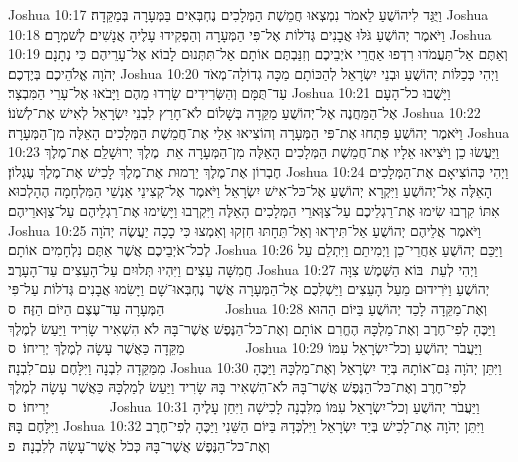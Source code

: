 Joshua 10:17	וַיֻּגַּד לִיהוֹשֻׁעַ לֵאמֹר נִמְצְאוּ חֲמֵשֶׁת הַמְּלָכִים נֶחְבְּאִים בַּמְּעָרָה בְּמַקֵּדָה׃
Joshua 10:18	וַיֹּאמֶר יְהוֹשֻׁעַ גֹּלּוּ אֲבָנִים גְּדֹלוֹת אֶל־פִּי הַמְּעָרָה וְהַפְקִידוּ עָלֶיהָ אֲנָשִׁים לְשׁמְרָם׃
Joshua 10:19	וְאַתֶּם אַל־תַּעֲמֹדוּ רִדְפוּ אַחֲרֵי אֹיְבֵיכֶם וְזִנַּבְתֶּם אוֹתָם אַל־תִּתְּנוּם לָבוֹא אֶל־עָרֵיהֶם כִּי נְתָנָם יְהֹוָה אֱלֹהֵיכֶם בְּיֶדְכֶם׃
Joshua 10:20	וַיְהִי כְּכַלּוֹת יְהוֹשֻׁעַ וּבְנֵי יִשְׂרָאֵל לְהַכּוֹתָם מַכָּה גְדוֹלָה־מְאֹד עַד־תֻּמָּם וְהַשְּׂרִידִים שָׂרְדוּ מֵהֶם וַיָּבֹאוּ אֶל־עָרֵי הַמִּבְצָר׃
Joshua 10:21	וַיָּשֻׁבוּ כל־הָעָם אֶל־הַמַּחֲנֶה אֶל־יְהוֹשֻׁעַ מַקֵּדָה בְּשָׁלוֹם לֹא־חָרַץ לִבְנֵי יִשְׂרָאֵל לְאִישׁ אֶת־לְשֹׁנוֹ׃
Joshua 10:22	וַיֹּאמֶר יְהוֹשֻׁעַ פִּתְחוּ אֶת־פִּי הַמְּעָרָה וְהוֹצִיאוּ אֵלַי אֶת־חֲמֵשֶׁת הַמְּלָכִים הָאֵלֶּה מִן־הַמְּעָרָה׃
Joshua 10:23	וַיַּעֲשׂוּ כֵן וַיֹּצִיאוּ אֵלָיו אֶת־חֲמֵשֶׁת הַמְּלָכִים הָאֵלֶּה מִן־הַמְּעָרָה אֵת  מֶלֶךְ יְרוּשָׁלַ͏ִם אֶת־מֶלֶךְ חֶבְרוֹן אֶת־מֶלֶךְ יַרְמוּת אֶת־מֶלֶךְ לָכִישׁ אֶת־מֶלֶךְ עֶגְלוֹן׃
Joshua 10:24	וַיְהִי כְּהוֹצִיאָם אֶת־הַמְּלָכִים הָאֵלֶּה אֶל־יְהוֹשֻׁעַ וַיִּקְרָא יְהוֹשֻׁעַ אֶל־כּל־אִישׁ יִשְׂרָאֵל וַיֹּאמֶר אֶל־קְצִינֵי אַנְשֵׁי הַמִּלְחָמָה הֶהָלְכוּא אִתּוֹ קִרְבוּ שִׂימוּ אֶת־רַגְלֵיכֶם עַל־צַוְּארֵי הַמְּלָכִים הָאֵלֶּה וַיִּקְרְבוּ וַיָּשִׂימוּ אֶת־רַגְלֵיהֶם עַל־צַוְּארֵיהֶם׃
Joshua 10:25	וַיֹּאמֶר אֲלֵיהֶם יְהוֹשֻׁעַ אַל־תִּירְאוּ וְאַל־תֵּחָתּוּ חִזְקוּ וְאִמְצוּ כִּי כָכָה יַעֲשֶׂה יְהֹוָה לְכל־אֹיְבֵיכֶם אֲשֶׁר אַתֶּם נִלְחָמִים אוֹתָם׃
Joshua 10:26	וַיַּכֵּם יְהוֹשֻׁעַ אַחֲרֵי־כֵן וַיְמִיתֵם וַיִּתְלֵם עַל חֲמִשָּׁה עֵצִים וַיִּהְיוּ תְּלוּיִם עַל־הָעֵצִים עַד־הָעָרֶב׃
Joshua 10:27	וַיְהִי לְעֵת  בּוֹא הַשֶּׁמֶשׁ צִוָּה יְהוֹשֻׁעַ וַיֹּרִידוּם מֵעַל הָעֵצִים וַיַּשְׁלִכֻם אֶל־הַמְּעָרָה אֲשֶׁר נֶחְבְּאוּ־שָׁם וַיָּשִׂמוּ אֲבָנִים גְּדֹלוֹת עַל־פִּי הַמְּעָרָה עַד־עֶצֶם הַיּוֹם הַזֶּה׃ {ס}        
Joshua 10:28	וְאֶת־מַקֵּדָה לָכַד יְהוֹשֻׁעַ בַּיּוֹם הַהוּא וַיַּכֶּהָ לְפִי־חֶרֶב וְאֶת־מַלְכָּהּ הֶחֱרִם אוֹתָם וְאֶת־כּל־הַנֶּפֶשׁ אֲשֶׁר־בָּהּ לֹא הִשְׁאִיר שָׂרִיד וַיַּעַשׂ לְמֶלֶךְ מַקֵּדָה כַּאֲשֶׁר עָשָׂה לְמֶלֶךְ יְרִיחוֹ׃ {ס}        
Joshua 10:29	וַיַּעֲבֹר יְהוֹשֻׁעַ וְכל־יִשְׂרָאֵל עִמּוֹ מִמַּקֵּדָה לִבְנָה וַיִּלָּחֶם עִם־לִבְנָה׃
Joshua 10:30	וַיִּתֵּן יְהֹוָה גַּם־אוֹתָהּ בְּיַד יִשְׂרָאֵל וְאֶת־מַלְכָּהּ וַיַּכֶּהָ לְפִי־חֶרֶב וְאֶת־כּל־הַנֶּפֶשׁ אֲשֶׁר־בָּהּ לֹא־הִשְׁאִיר בָּהּ שָׂרִיד וַיַּעַשׂ לְמַלְכָּהּ כַּאֲשֶׁר עָשָׂה לְמֶלֶךְ יְרִיחוֹ׃ {ס}        
Joshua 10:31	וַיַּעֲבֹר יְהוֹשֻׁעַ וְכל־יִשְׂרָאֵל עִמּוֹ מִלִּבְנָה לָכִישָׁה וַיִּחַן עָלֶיהָ וַיִּלָּחֶם בָּהּ׃
Joshua 10:32	וַיִּתֵּן יְהֹוָה אֶת־לָכִישׁ בְּיַד יִשְׂרָאֵל וַיִּלְכְּדָהּ בַּיּוֹם הַשֵּׁנִי וַיַּכֶּהָ לְפִי־חֶרֶב וְאֶת־כּל־הַנֶּפֶשׁ אֲשֶׁר־בָּהּ כְּכֹל אֲשֶׁר־עָשָׂה לְלִבְנָה׃ {פ}
